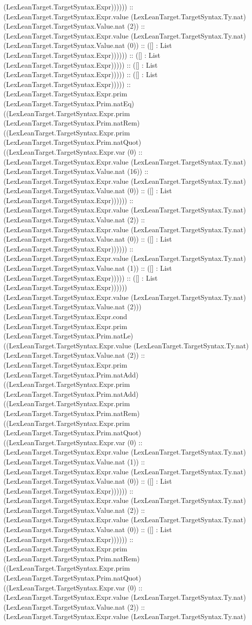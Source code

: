 \documentclass[11pt]{article}
\begin{document}
(LexLeanTarget.TargetSyntax.Expr)))))) :: (LexLeanTarget.TargetSyntax.Expr.value (LexLeanTarget.TargetSyntax.Ty.nat) (LexLeanTarget.TargetSyntax.Value.nat (2)) :: (LexLeanTarget.TargetSyntax.Expr.value (LexLeanTarget.TargetSyntax.Ty.nat) (LexLeanTarget.TargetSyntax.Value.nat (0)) :: ([] : List (LexLeanTarget.TargetSyntax.Expr)))))) :: ([] : List (LexLeanTarget.TargetSyntax.Expr))))) :: ([] : List (LexLeanTarget.TargetSyntax.Expr))))) :: ([] : List (LexLeanTarget.TargetSyntax.Expr))))) :: (LexLeanTarget.TargetSyntax.Expr.prim (LexLeanTarget.TargetSyntax.Prim.natEq) ((LexLeanTarget.TargetSyntax.Expr.prim (LexLeanTarget.TargetSyntax.Prim.natRem) ((LexLeanTarget.TargetSyntax.Expr.prim (LexLeanTarget.TargetSyntax.Prim.natQuot) ((LexLeanTarget.TargetSyntax.Expr.var (0) :: (LexLeanTarget.TargetSyntax.Expr.value (LexLeanTarget.TargetSyntax.Ty.nat) (LexLeanTarget.TargetSyntax.Value.nat (16)) :: (LexLeanTarget.TargetSyntax.Expr.value (LexLeanTarget.TargetSyntax.Ty.nat) (LexLeanTarget.TargetSyntax.Value.nat (0)) :: ([] : List (LexLeanTarget.TargetSyntax.Expr)))))) :: (LexLeanTarget.TargetSyntax.Expr.value (LexLeanTarget.TargetSyntax.Ty.nat) (LexLeanTarget.TargetSyntax.Value.nat (2)) :: (LexLeanTarget.TargetSyntax.Expr.value (LexLeanTarget.TargetSyntax.Ty.nat) (LexLeanTarget.TargetSyntax.Value.nat (0)) :: ([] : List (LexLeanTarget.TargetSyntax.Expr)))))) :: (LexLeanTarget.TargetSyntax.Expr.value (LexLeanTarget.TargetSyntax.Ty.nat) (LexLeanTarget.TargetSyntax.Value.nat (1)) :: ([] : List (LexLeanTarget.TargetSyntax.Expr))))) :: ([] : List (LexLeanTarget.TargetSyntax.Expr)))))) (LexLeanTarget.TargetSyntax.Expr.value (LexLeanTarget.TargetSyntax.Ty.nat) (LexLeanTarget.TargetSyntax.Value.nat (2))) (LexLeanTarget.TargetSyntax.Expr.cond (LexLeanTarget.TargetSyntax.Expr.prim (LexLeanTarget.TargetSyntax.Prim.natLe) ((LexLeanTarget.TargetSyntax.Expr.value (LexLeanTarget.TargetSyntax.Ty.nat) (LexLeanTarget.TargetSyntax.Value.nat (2)) :: (LexLeanTarget.TargetSyntax.Expr.prim (LexLeanTarget.TargetSyntax.Prim.natAdd) ((LexLeanTarget.TargetSyntax.Expr.prim (LexLeanTarget.TargetSyntax.Prim.natAdd) ((LexLeanTarget.TargetSyntax.Expr.prim (LexLeanTarget.TargetSyntax.Prim.natRem) ((LexLeanTarget.TargetSyntax.Expr.prim (LexLeanTarget.TargetSyntax.Prim.natQuot) ((LexLeanTarget.TargetSyntax.Expr.var (0) :: (LexLeanTarget.TargetSyntax.Expr.value (LexLeanTarget.TargetSyntax.Ty.nat) (LexLeanTarget.TargetSyntax.Value.nat (1)) :: (LexLeanTarget.TargetSyntax.Expr.value (LexLeanTarget.TargetSyntax.Ty.nat) (LexLeanTarget.TargetSyntax.Value.nat (0)) :: ([] : List (LexLeanTarget.TargetSyntax.Expr)))))) :: (LexLeanTarget.TargetSyntax.Expr.value (LexLeanTarget.TargetSyntax.Ty.nat) (LexLeanTarget.TargetSyntax.Value.nat (2)) :: (LexLeanTarget.TargetSyntax.Expr.value (LexLeanTarget.TargetSyntax.Ty.nat) (LexLeanTarget.TargetSyntax.Value.nat (0)) :: ([] : List (LexLeanTarget.TargetSyntax.Expr)))))) :: (LexLeanTarget.TargetSyntax.Expr.prim (LexLeanTarget.TargetSyntax.Prim.natRem) ((LexLeanTarget.TargetSyntax.Expr.prim (LexLeanTarget.TargetSyntax.Prim.natQuot) ((LexLeanTarget.TargetSyntax.Expr.var (0) :: (LexLeanTarget.TargetSyntax.Expr.value (LexLeanTarget.TargetSyntax.Ty.nat) (LexLeanTarget.TargetSyntax.Value.nat (2)) :: (LexLeanTarget.TargetSyntax.Expr.value (LexLeanTarget.TargetSyntax.Ty.nat) 
\end{document}
